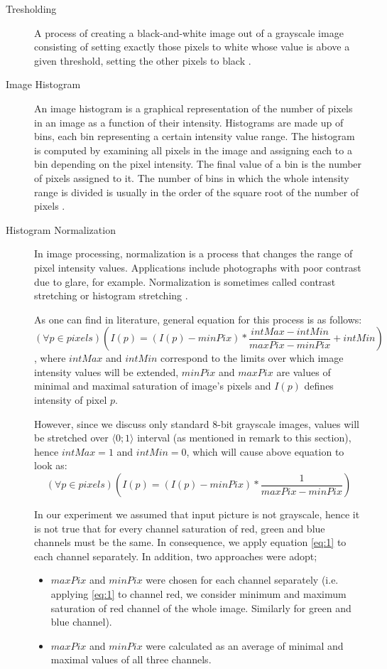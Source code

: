 \documentclass{article}
\begin{document}
\begin{description}
\item[Tresholding]
A process of creating a black-and-white image out of a grayscale image consisting of setting exactly those pixels to white whose value is above a given threshold, setting the other pixels to black \cite{tresholding_def}.
\item[Image Histogram]
An image histogram is a graphical representation of the number of pixels in an image as a function of their intensity.
Histograms are made up of bins, each bin representing a certain intensity value range. The histogram is computed by examining all pixels in the image and assigning each to a bin depending on the pixel intensity. The final value of a bin is the number of pixels assigned to it. The number of bins in which the whole intensity range is divided is usually in the order of the square root of the number of pixels \cite{image_histogram_def}.
\item[Histogram Normalization]
In image processing, normalization is a process that changes the range of pixel intensity values. Applications include photographs with poor contrast due to glare, for example. Normalization is sometimes called contrast stretching or histogram stretching \cite{histogram_normalization_def}. 

As one can find in literature, general equation for this process is as follows:
\[
(\forall{p \in pixels} )(I(p) = (I(p) - minPix) * \frac{intMax - intMin}{maxPix - minPix} + intMin)
\]
, where $intMax$ and $intMin$ correspond to the limits over which image intensity values will be extended,
$minPix$ and $maxPix$ are values of minimal and maximal saturation of image's pixels and $I(p)$ defines intensity of pixel $p$.

However, since we discuss only standard 8-bit grayscale images, values will be stretched over $\langle0;1\rangle$ interval (as mentioned in remark to this section), hence $intMax = 1$ and $intMin = 0$, which will cause above equation to look as:
\begin{equation} \label{eq:1}
(\forall{p \in pixels} )(I(p) = (I(p) - minPix) * \frac{1}{maxPix - minPix})
\end{equation}

In our experiment we assumed that input picture is not grayscale, hence it is not true that for every channel saturation of red, green and blue channels must be the same. In consequence, we apply equation \ref{eq:1} to each channel separately. In addition, two approaches were adopt;
\begin{itemize}
  \item $maxPix$ and $minPix$ were chosen for each channel separately (i.e. applying \ref{eq:1} to channel red, we consider minimum and maximum saturation of red channel of the whole image. Similarly for green and blue channel).
  \item $maxPix$ and $minPix$ were calculated as an average of minimal and maximal values of all three channels.
\end{itemize}


\end{description}
\end{document}
